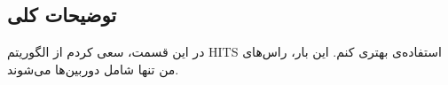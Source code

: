 \section{}

\subsection{توضیحات کلی}
در این قسمت، سعی کردم از الگوریتم 
HITS
استفاده‌ی بهتری کنم. این بار، راس‌های من تنها شامل دوربین‌ها می‌شوند. 